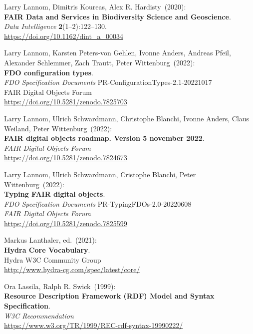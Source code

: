 \begin{thebibliography}{9}
Larry Lannom, Dimitris Koureas, Alex R. Hardisty~(2020): \\
\textbf{FAIR Data and Services in Biodiversity Science and
Geoscience}.\\
\emph{Data Intelligence} \textbf{2}(1--2):122--130.\\
\url{https://doi.org/10.1162/dint_a_00034}

Larry Lannom, Karsten Peters-von Gehlen, Ivonne Anders, Andreas Pfeil,
Alexander Schlemmer, Zach Trautt, Peter Wittenburg~(2022): \\
\textbf{{FDO} configuration types}. \\
\emph{FDO Specification Documents} PR-ConfigurationTypes-2.1-20221017 \\
FAIR Digital Objects Forum \\
\url{https://doi.org/10.5281/zenodo.7825703}

Larry Lannom, Ulrich Schwardmann, Christophe Blanchi, Ivonne Anders,
Claus Weiland, Peter Wittenburg~(2022): \\
\textbf{FAIR digital objects roadmap. Version 5 november 2022}.\\
\emph{FAIR Digital Objects Forum}\\
\url{https://doi.org/10.5281/zenodo.7824673}

Larry Lannom, Ulrich Schwardmann, Cristophe Blanchi, Peter Wittenburg~(2022): \\
\textbf{Typing {FAIR} digital objects}. \\
\emph{FDO Specification Documents} PR-TypingFDOs-2.0-20220608 \\
\emph{FAIR Digital Objects Forum}\\
\url{https://doi.org/10.5281/zenodo.7825599}

Markus Lanthaler, ed.~(2021): \\
\textbf{Hydra Core Vocabulary}.\\
Hydra W3C Community Group\\
\url{http://www.hydra-cg.com/spec/latest/core/} 

Ora Lassila, Ralph R. Swick~(1999): \\
\textbf{Resource {Description Framework} ({RDF}) {Model} and {Syntax Specification}}. \\
\emph{W3C Recommendation}\\
\url{https://www.w3.org/TR/1999/REC-rdf-syntax-19990222/}  


\end{thebibliography}
